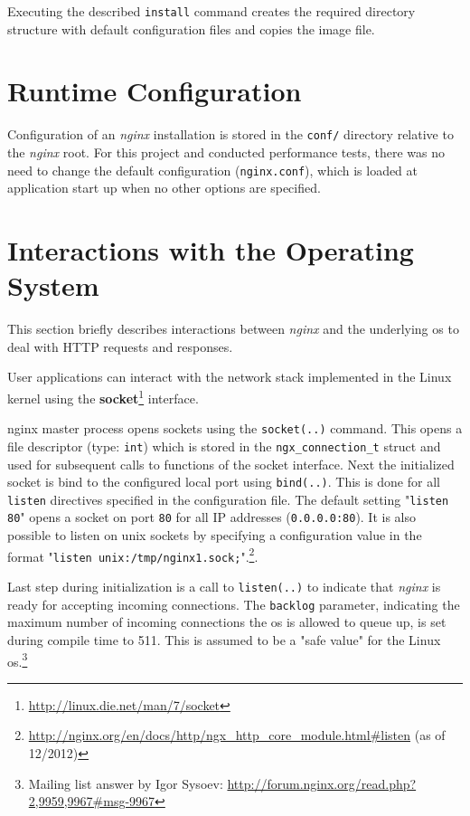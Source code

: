 Executing the described \texttt{install} command creates the required directory structure with default configuration files and copies the image file.

\section{Runtime Configuration}

Configuration of an \textit{nginx} installation is stored in the \texttt{conf/} directory relative to the \textit{nginx} root. For this project and conducted performance tests, there was no need to change the default configuration (\texttt{nginx.conf}), which is loaded at application start up when no other options are specified.

\section{Interactions with the Operating System}
\label{sec:nginx-os-if}

This section briefly describes interactions between \textit{nginx} and the underlying \gls{os} to deal with HTTP requests and responses.

User applications can interact with the network stack implemented in the Linux kernel using the \textbf{socket}\footnote{\url{http://linux.die.net/man/7/socket}} interface.

nginx master process opens sockets using the \texttt{socket(..)} command. This opens a file descriptor (type: \texttt{int}) which is stored in the \texttt{ngx\_connection\_t} struct and used for subsequent calls to functions of the socket interface. Next the initialized socket is bind to the configured local port using \texttt{bind(..)}. This is done for all \texttt{listen} directives specified in the configuration file. The default setting "\texttt{listen 80}" opens a socket on port \texttt{80} for all IP addresses (\texttt{0.0.0.0:80}). It is also possible to listen on unix sockets by specifying a configuration value in the format "\texttt{listen unix:/tmp/nginx1.sock;}".\footnote{\url{http://nginx.org/en/docs/http/ngx\_http\_core\_module.html\#listen} (as of 12/2012)}.

Last step during initialization is a call to \texttt{listen(..)} to indicate that \textit{nginx} is ready for accepting incoming connections. The \texttt{backlog} parameter, indicating the maximum number of incoming connections the \gls{os} is allowed to queue up, is set during compile time to 511. This is assumed to be a "safe value" for the Linux \gls{os}.\footnote{Mailing list answer by Igor Sysoev: \url{http://forum.nginx.org/read.php?2,9959,9967\#msg-9967}}

